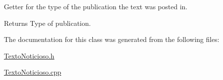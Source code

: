 Getter for the type of the publication the text was posted in. 

\begin{DoxyReturn}{Returns}
Type of publication. 
\end{DoxyReturn}


The documentation for this class was generated from the following files\-:\begin{DoxyCompactItemize}
\item 
\hyperlink{_texto_noticioso_8h}{Texto\-Noticioso.\-h}\item 
\hyperlink{_texto_noticioso_8cpp}{Texto\-Noticioso.\-cpp}\end{DoxyCompactItemize}
